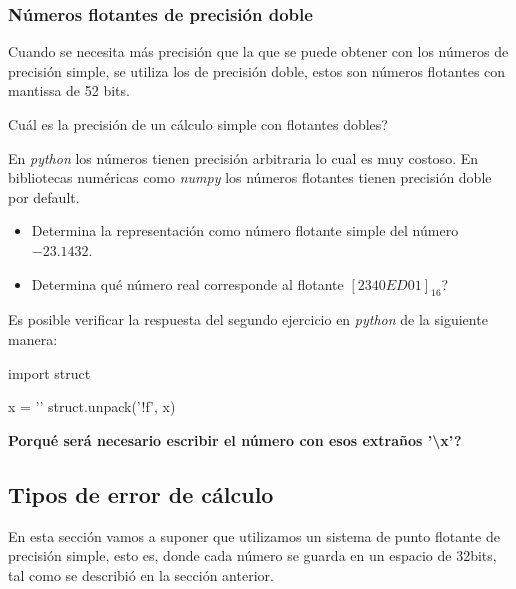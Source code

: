 \subsubsection{Números flotantes de precisión doble}

Cuando se necesita más precisión que la que se puede obtener con los números de precisión simple, se utiliza los de precisión doble, estos son números flotantes con mantissa de 52 bits. 

\begin{exercise}
  Cuál es la precisión de un cálculo simple con flotantes dobles?
\end{exercise}

\begin{remark}
  En \emph{python} los números tienen precisión arbitraria lo cual es muy costoso. En bibliotecas numéricas como \emph{numpy} los números flotantes tienen precisión doble por default.
\end{remark}

\begin{exercise}
  \begin{itemize}
  \item Determina la representación como número flotante simple del número $-23.1432$.
  \item Determina qué número real corresponde al flotante $[2340ED01]_{16}$?
  \end{itemize}
\end{exercise}

\begin{remark}
  Es posible verificar la respuesta del segundo ejercicio en \emph{python} de la siguiente manera:

  \begin{pythoncode}
    import struct

    x = '\xED{}'
    struct.unpack('!f', x)
  \end{pythoncode}

\textbf{Porqué será necesario escribir el número con esos extraños '\textbackslash x'?}
\end{remark}

\subsection{Tipos de error de cálculo}

En esta sección vamos a suponer que utilizamos un sistema de punto flotante de precisión simple, esto es, donde cada número se guarda en un espacio de 32bits, tal como se describió en la sección anterior.\\


